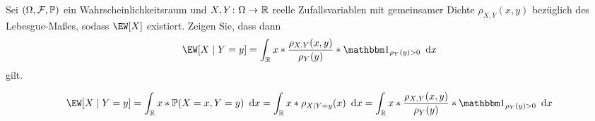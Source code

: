 \begin{exercisePage}
	\begin{homework}
		Sei $(\Omega, \mathcal{F}, \mathbb{P})$ ein Wahrscheinlichkeitsraum und $\abb{X,Y}{\Omega}{\R}$ reelle Zufallsvariablen mit gemeinsamer Dichte $\rho_{X,Y}(x,y)$ bezüglich des Lebesgue-Maßes, sodass $\EW[X]$ existiert. Zeigen Sie, dass dann 
		\begin{equation*}
			\EW[X \mid Y=y] = \int_\R x * \frac{\rho_{X,Y}(x,y)}{\rho_Y(y)} * \one_{\rho_Y(y) > 0} \dx
		\end{equation*}
		gilt.
	\end{homework}

	\begin{equation*}
		\EW[X \mid Y=y] = \int_\R x * \P(X=x , Y=y) \dx = \int_\R x * \rho_{X \mid Y = y}(x) \dx = \int_\R x * \frac{\rho_{X,Y}(x,y)}{\rho_Y(y)} * \one_{\rho_Y(y) > 0} \dx
	\end{equation*}
\end{exercisePage}